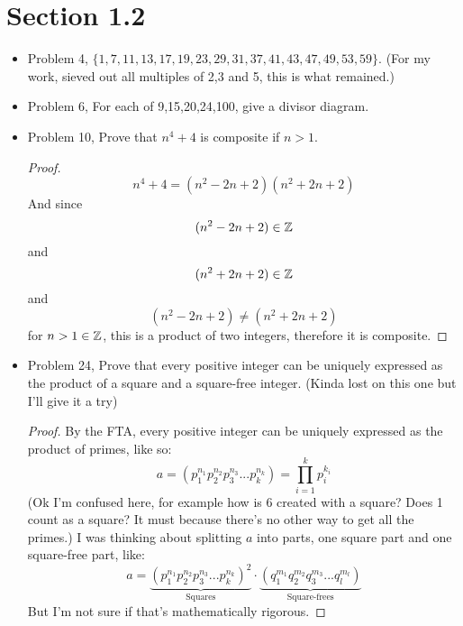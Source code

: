 \documentclass[hidelinks,12pt]{article}
\begin{document}
\section{Section 1.2}
\begin{itemize}
    \item Problem 4, $\{1,7,11,13,17,19,23,29,31,37,41,43,47,49,53,59\}$. (For my work, sieved out all multiples of 2,3 and 5, this is what remained.)
    \item Problem 6, For each of 9,15,20,24,100, give a divisor diagram.\newline{}
    \item Problem 10, Prove that $n^4+4$ is composite if $n>1$.\begin{proof}
    $$n^4+4=(n^2-2n+2)(n^2+2n+2)$$And since $$(n^2-2n+2)\in\mathbb{Z}$$and $$(n^2+2n+2)\in\mathbb{Z}$$ and $$(n^2-2n+2)\neq(n^2+2n+2)$$ for $n>1\in\mathbb{Z}$, this is a product of two integers, therefore it is composite.
    \end{proof}
    \item Problem 24, Prove that every positive integer can be uniquely expressed as the product of a square and a square-free integer. (Kinda lost on this one but I'll give it a try)
    \begin{proof}
    By the FTA, every positive integer can be uniquely expressed as the product of primes, like so:$$a=(p_1^{n_1}p_2^{n_2}p_3^{n_3}...p_k^{n_k})=\prod_{i=1}^kp_i^{k_i}$$ (Ok I'm confused here, for example how is 6 created with a square? Does 1 count as a square? It must because there's no other way to get all the primes.) I was thinking about splitting $a$ into parts, one square part and one square-free part, like: $$a=\underbrace{(p_1^{n_1}p_2^{n_2}p_3^{n_3}...p_k^{n_k})^2}_{\text{Squares}}\cdot\underbrace{(q_1^{m_1}q_2^{m_2}q_3^{m_3}...q_l^{m_l})}_{\text{Square-frees}}$$But I'm not sure if that's mathematically rigorous.
    \end{proof}
\end{itemize}
\end{document}
